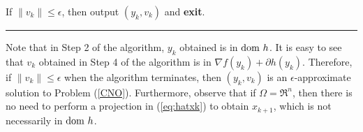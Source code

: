 \documentclass[11pt]{article}
\newtheorem{proposition}[thm]{Proposition}
\newcommand{\mb}[1]{\mbox{\boldmath $#1$}}
\begin{document}
\vspace{10pt}

 If $\|v_{k} \| \leq \epsilon$, then output  $(y_{k},v_{k})$ and {\bf{exit}}.


\noindent \rule[0.5ex]{1\columnwidth}{1pt}

%
%
%

\vspace{10pt}

\noindent Note that in Step 2 of the algorithm, $y_k$ obtained is in ${\rm{dom}} \ h$.  It is easy to see that $v_{k}$ obtained in Step 4 of the algorithm is in $\nabla f(y_{k}) + \partial h(y_{k})$.  Therefore, if $\| v_{k} \| \leq \epsilon$ when the algorithm terminates, then $(y_{k},v_{k})$ is an $\epsilon$-approximate solution to Problem (\ref{CNO}).   Furthermore, observe that if $\Omega = \Re^n$, then there is no need to perform a projection in (\ref{eq:hatxk}) to obtain $x_{k+1}$, which is not necessarily in ${\rm{dom}}\ h$.
\end{document}

